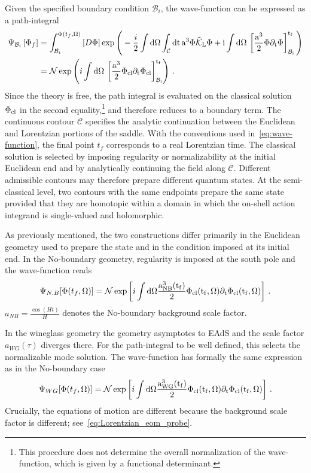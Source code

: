 \documentclass[a4paper,11pt]{article}
\begin{document}
Given the specified boundary condition $\mathcal{B}_i$, the wave-function can be expressed as a path-integral
\begin{equation}\label{eq:wave-function}
\begin{aligned}
    \Psi_{\mathcal{B}_i}\left[\Phi_f\right] &= \int_{\mathcal{B}_i}^{\Phi(t_f,\Omega)}\left[D\Phi\right] \exp\Bigg(-\frac{i}{2}\int \rm{d}\Omega\int_{\mathcal{C}}  \rm{d}t\,a^3\Phi {\displaystyle \widehat{\mathcal{K}}_L}\Phi +i\int \rm{d}\Omega\,\left[\frac{a^3}{2}\Phi\partial_t\Phi\right]^{t_f}_{\mathcal{B}_i}\Bigg)\\
     &=\mathcal{N}\exp\left(i\int \rm{d}\Omega\,\left[\frac{a^3}{2}\Phi_{\rm cl}\partial_t\Phi_{\rm cl}\right]^{t_f}_{\mathcal{B}_i}\right)\,.
\end{aligned}
\end{equation}
Since the theory is free, the path integral is evaluated on the classical solution $\Phi_{\rm cl}$ in the second equality,\footnote{This procedure does not determine the overall normalization of the wave-function, which is given by a functional determinant.} and therefore reduces to a boundary term. The continuous contour $\mathcal{C}$ specifies the analytic continuation between the Euclidean and Lorentzian portions of the saddle. With the conventions used in~\eqref{eq:wave-function}, the final point $t_f$ corresponds to a real Lorentzian time. The classical solution is selected by imposing regularity or normalizability at the initial Euclidean end and by analytically continuing the field along $\mathcal{C}$. Different admissible contours may therefore prepare different quantum states. At the semi-classical level, two contours with the same endpoints prepare the same state provided that they are homotopic within a domain in which the on-shell action integrand is single-valued and holomorphic. 

As previously mentioned, the two constructions differ primarily in the Euclidean geometry used to prepare the state and in the condition imposed at its initial end. In the No-boundary geometry, regularity is imposed at the south pole and the wave-function reads
\begin{equation}\label{eq:no-boundary}
    \Psi_{N.B}[\Phi(t_f,\Omega)]=\mathcal{N}\exp\left[i\int \rm{d} \Omega \frac{a_{NB}^3(t_f)}{2}\Phi_{\rm cl}(t_f,\Omega) \partial_t\Phi_{\rm cl}(t_f,\Omega)\right]\,.
\end{equation}
$a_{NB}=\frac{\cos(Ht)}{H}$ denotes the No-boundary background scale factor.

In the wineglass geometry the geometry asymptotes to EAdS and the scale factor $a_{WG}(\tau)$ diverges there. For the path-integral to be well defined, this selects the normalizable mode solution. The wave-function has formally the same expression as in the No-boundary case
\begin{equation}\label{eq:Wineglass}
    \Psi_{WG}[\Phi(t_f,\Omega)]=\mathcal{N}\exp\left[i\int \rm{d} \Omega \frac{a_{WG}^3(t_f)}{2}\Phi_{\rm cl}(t_f,\Omega) \partial_t\Phi_{\rm cl}(t_f,\Omega)\right]\,.
\end{equation}
Crucially, the equations of motion are different because the background scale factor is different; see~\eqref{eq:Lorentzian_eom_probe}.
\end{document}
